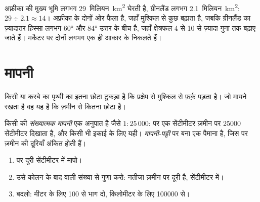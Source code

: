 \begin{example}[ग्रीनलैंड और अफ़्रीका]
अफ़्रीका की मुख्य भूमि लगभग 29~मिलियन~\unit{km^2} घेरती है, ग्रीनलैंड लगभग
2.1~मिलियन~\unit{km^2}: $29 \div 2.1 \approx 14$। अफ़्रीका  के दोनों ओर
फैला है, जहाँ  मुश्किल से कुछ बढ़ाता है, जबकि ग्रीनलैंड का ज़्यादातर हिस्सा लगभग
\ang{60} और \ang{84} उत्तर के बीच है, जहाँ क्षेत्रफल 4 से 10 से ज़्यादा गुना तक बढ़ाए जाते
हैं। मर्केटर  पर दोनों लगभग एक ही आकार के निकलते
हैं।
\end{example}

\section{मापनी}

किसी  या कस्बे का  पृथ्वी का इतना छोटा टुकड़ा है कि प्रक्षेप से मुश्किल से फ़र्क़
पड़ता है। जो मायने रखता है वह यह है कि  ज़मीन से कितना छोटा
है।

\begin{definition}[संख्यात्मक मापनी और मापनी-पट्टी]\label{def:g9:maps-of-the-earth:numerical-scale}
किसी  की \emph{संख्यात्मक मापनी} एक अनुपात है जैसे
$1 : 25\,000$:  पर एक सेंटीमीटर ज़मीन पर \num{25000} सेंटीमीटर दिखाता है, और
किसी भी इकाई के लिए यही। \emph{मापनी-पट्टी}  पर बना एक
पैमाना है, जिस पर ज़मीन की दूरियाँ अंकित होती
हैं।
\end{definition}

\begin{method}[संख्यात्मक मापनी का उपयोग]
\begin{enumerate}
  \item {} पर दूरी सेंटीमीटर में मापो।
  \item उसे कोलन के बाद वाली संख्या से गुणा करो: नतीजा ज़मीन पर दूरी है,
        सेंटीमीटर में।
  \item बदलो: मीटर के लिए 100 से भाग दो, किलोमीटर के लिए \num{100000} से।
\end{enumerate}
\end{method}

